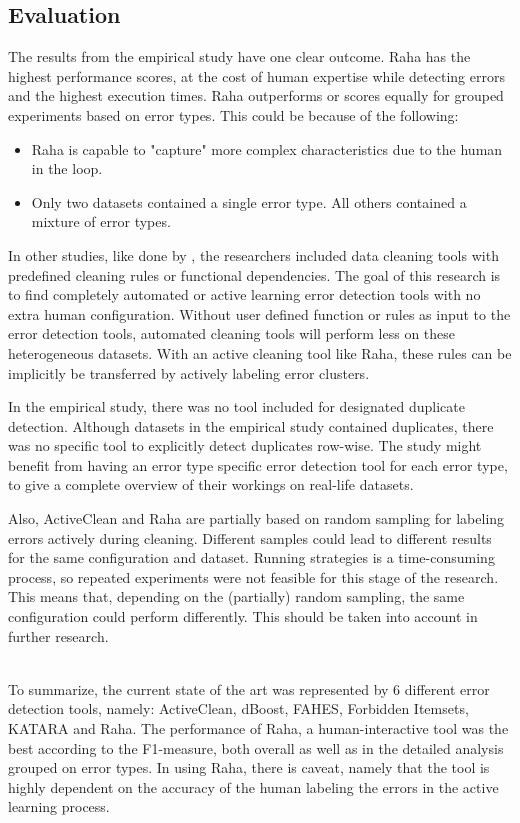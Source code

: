 \subsection{Evaluation}
\label{subsec:evaluation_empirical_study_results}
The results from the empirical study have one clear outcome. Raha has the highest performance scores, at the cost of human expertise while detecting errors and the highest execution times. 
Raha outperforms or scores equally for grouped experiments based on error types. This could be because of the following:
\begin{itemize}
    \item Raha is capable to "capture" more complex characteristics due to the human in the loop.
    \item Only two datasets contained a single error type. All others contained a mixture of error types.
\end{itemize}

In other studies, like done by \cite{Abedjan2016-jc}, the researchers included data cleaning tools with predefined cleaning rules or functional dependencies. The goal of this research is to find completely automated or active learning error detection tools with no extra human configuration. Without user defined function or rules as input to the error detection tools, automated cleaning tools will perform less on these heterogeneous datasets. With an active cleaning tool like Raha, these rules can be implicitly be transferred by actively labeling error clusters.

In the empirical study, there was no tool included for designated duplicate detection. Although datasets in the empirical study contained duplicates, there was no specific tool to explicitly detect duplicates row-wise. The study might benefit from having an error type specific error detection tool for each error type, to give a complete overview of their workings on real-life datasets.

Also, ActiveClean and Raha are partially based on random sampling for labeling errors actively during cleaning. Different samples could lead to different results for the same configuration and dataset. Running strategies is a time-consuming process, so repeated experiments were not feasible for this stage of the research. This means that, depending on the (partially) random sampling, the same configuration could perform differently. This should be taken into account in further research. 

~\\To summarize, the current state of the art was represented by 6 different error detection tools, namely: ActiveClean, dBoost, FAHES, Forbidden Itemsets, KATARA and Raha. The performance of Raha, a human-interactive tool was the best according to the F1-measure, both overall as well as in the detailed analysis grouped on error types. In using Raha, there is caveat, namely that the tool is highly dependent on the accuracy of the human labeling the errors in the active learning process. 